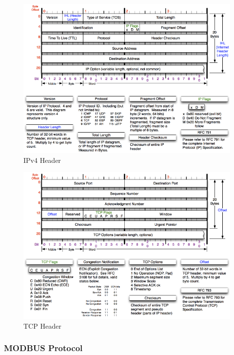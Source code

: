 \documentclass[11pt,]{article}
\begin{document}
\begin{figure}[h]

{\centering \includegraphics{thesis_files/figure-latex/unnamed-chunk-6-1} 

}

\caption{IPv4 Header}\label{fig:unnamed-chunk-6}
\end{figure}

\begin{figure}[h]

{\centering \includegraphics{thesis_files/figure-latex/unnamed-chunk-7-1} 

}

\caption{TCP Header}\label{fig:unnamed-chunk-7}
\end{figure}

\subsubsection{MODBUS Protocol}\label{modbus-protocol}
\end{document}
